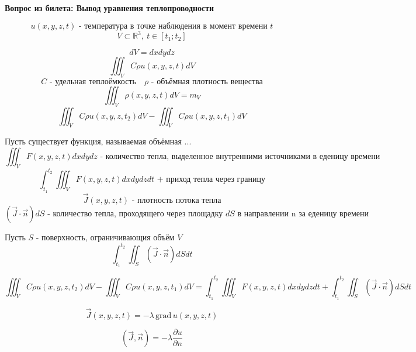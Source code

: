 \documentclass[a4paper]{article}
\theoremstyle{definition}
\begin{document}
\textbf{Вопрос из билета: Вывод уравнения теплопроводности}

\[
    u(x,y,z,t) \text{ - температура в точке наблюдения в момент времени } t
\]
\[
    V \subset \mathbb{R}^3, \ t \in [t_1; t_2]
\]

\[
    dV = dxdydz
\]
\[
    \iiint_V C \rho u(x,y,z,t) dV
\]
\[
    C \text{ - удельная теплоёмкость} \quad \rho \text{ - объёмная плотность 
    вещества}
\]
\[
    \iiint_V \rho(x,y,z,t) dV = m_V
\]
\[
    \iiint_V C \rho u(x,y,z,t_2) dV - \iiint_V C \rho u(x,y,z,t_1) dV
\]

Пусть существует функция, называемая объёмная ... 
\[
    \iiint_V F(x,y,z,t) dx dy dz \text{ - количество тепла, выделенное внутренними
    источниками в еденицу времени}
\]
\[
    \int_{t_1}^{t_2} \iiint_V F(x,y,z,t) dx dy dz dt 
    \text{ + приход тепла через границу}
\]
\[
    \vec{J}(x,y,z,t) \text{ - плотность потока тепла}
\]
\[
    (\vec{J} \cdot \vec{n}) dS \text{ - количество тепла, проходящего через
    площадку } dS \text{ в направлении n за еденицу времени}
\]

Пусть $ S $ - поверхность, ограничивающия объём $ V $ 
\[
    \int_{t_1}^{t_2} \iint_S (\vec{J} \cdot \vec{n}) dS dt
\]


\[
    \iiint_V C \rho u(x,y,z,t_2) dV - \iiint_V C \rho u(x,y,z,t_1) dV =
    \int_{t_1}^{t_2} \iiint_V F(x,y,z,t) dx dy dz dt +
    \int_{t_1}^{t_2} \iint_S (\vec{J} \cdot \vec{n}) dS dt
\]

\begin{tcolorbox}[title=Закон Фурье]
\[
    \vec{J}(x,y,z,t) = -\lambda \, \text{grad} \, u(x,y,z,t)
\]
\end{tcolorbox}

\[
    (\vec{J}, \vec{n}) = -\lambda \frac{\partial u}{\partial n} 
\]
\end{document}
